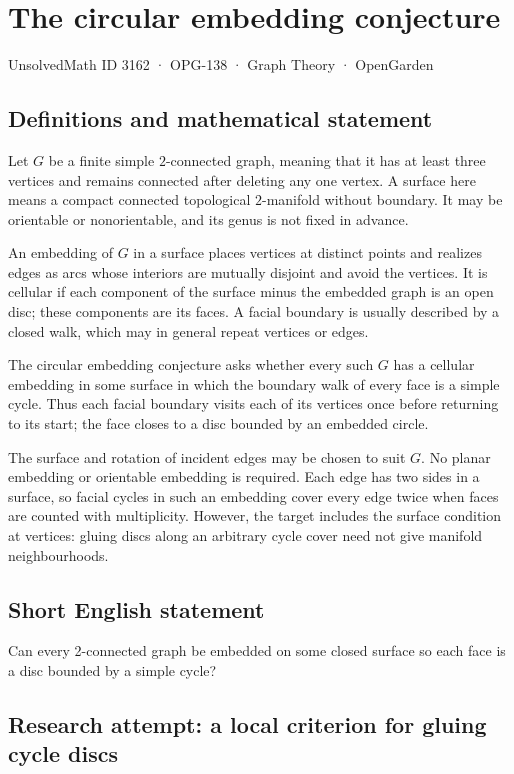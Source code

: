 \documentclass[11pt,a4paper]{article}
\begin{document}
\section*{The circular embedding conjecture}\label{3162}
{\small UnsolvedMath ID 3162 · OPG-138 · Graph Theory · OpenGarden}
\subsection{Definitions and mathematical statement}
Let $G$ be a finite simple $2$-connected graph, meaning that
it has at least three vertices and remains connected after
deleting any one vertex. A surface here means a compact
connected topological $2$-manifold without boundary. It may be
orientable or nonorientable, and its genus is not fixed in
advance.

An embedding of $G$ in a surface places vertices at distinct
points and realizes edges as arcs whose interiors are mutually
disjoint and avoid the vertices. It is cellular if each
component of the surface minus the embedded graph is an open
disc; these components are its faces. A facial boundary is
usually described by a closed walk, which may in general
repeat vertices or edges.

The circular embedding conjecture asks whether every such $G$
has a cellular embedding in some surface in which the boundary
walk of every face is a simple cycle. Thus each facial boundary
visits each of its vertices once before returning to its start;
the face closes to a disc bounded by an embedded circle.

The surface and rotation of incident edges may be chosen to
suit $G$. No planar embedding or orientable embedding is
required. Each edge has two sides in a surface, so facial
cycles in such an embedding cover every edge twice when faces
are counted with multiplicity. However, the target includes
the surface condition at vertices: gluing discs along an
arbitrary cycle cover need not give manifold neighbourhoods.
\subsection{Short English statement}
Can every 2-connected graph be embedded on some closed surface so each face is a disc bounded by a simple cycle?
\subsection{Research attempt: a local criterion for gluing cycle discs}
\end{document}
